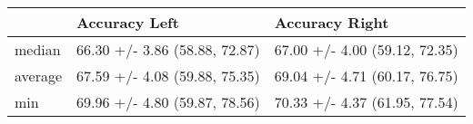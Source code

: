 \begin{tabular}{lll}
\toprule
{} &                  Accuracy Left &                 Accuracy Right \\
\midrule
median  &  66.30 +/- 3.86 (58.88, 72.87) &  67.00 +/- 4.00 (59.12, 72.35) \\
average &  67.59 +/- 4.08 (59.88, 75.35) &  69.04 +/- 4.71 (60.17, 76.75) \\
min     &  69.96 +/- 4.80 (59.87, 78.56) &  70.33 +/- 4.37 (61.95, 77.54) \\
\bottomrule
\end{tabular}
